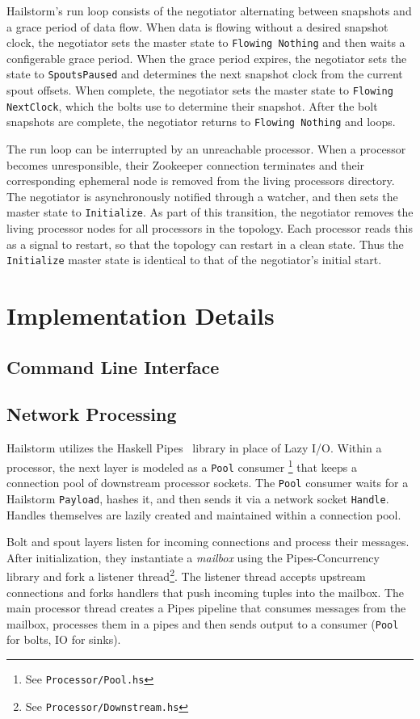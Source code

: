 \documentclass[10pt,nocopyrightspace]{sigplanconf}
\begin{document}
Hailstorm's run loop consists of the negotiator alternating between snapshots
and a grace period of data flow. When data is flowing without a desired snapshot
clock, the negotiator sets the master state to \texttt{Flowing Nothing} and
then waits a configerable grace period. When the grace period expires, the
negotiator sets the state to \texttt{SpoutsPaused} and determines the next
snapshot clock from the current spout offsets. When complete, the negotiator sets
the master state to \texttt{Flowing NextClock}, which the bolts use to determine
their snapshot. After the bolt snapshots are complete, the negotiator returns to
\texttt{Flowing Nothing} and loops.

The run loop can be interrupted by an unreachable processor. When a processor
becomes unresponsible, their Zookeeper connection terminates and their
corresponding ephemeral node is removed from the living processors directory.
The negotiator is asynchronously notified through a watcher, and then sets the
master state to \texttt{Initialize}. As part of this transition, the negotiator
removes the living processor nodes for all processors in the topology. Each
processor reads this as a signal to restart, so that the topology can restart in
a clean state. Thus the \texttt{Initialize} master state is identical to that of
the negotiator's initial start.

\section{Implementation Details}
\subsection{Command Line Interface}

\subsection{Network Processing}
Hailstorm utilizes the Haskell Pipes~\cite{pipes} library
in place of Lazy I/O. Within
a processor, the next layer is modeled as a \texttt{Pool} consumer
\footnote{See \texttt{Processor/Pool.hs}} that keeps a connection pool
of downstream processor sockets. The \texttt{Pool} consumer waits for a
Hailstorm \texttt{Payload}, hashes it, and then sends it via a network socket
\texttt{Handle}. Handles themselves are lazily created and maintained within a
connection pool.

Bolt and spout layers listen for incoming connections and process their
messages. After initialization, they instantiate a \textit{mailbox} using the
Pipes-Concurrency~\cite{pipes-concurrency} library and fork a listener
thread\footnote{See \texttt{Processor/Downstream.hs}}. The listener thread 
accepts upstream connections and forks handlers that push incoming tuples 
into the mailbox. The main processor thread creates a Pipes pipeline that
consumes messages from the mailbox, processes them in a pipes
and then sends output to a consumer (\texttt{Pool} for bolts, 
IO for sinks).
\end{document}
